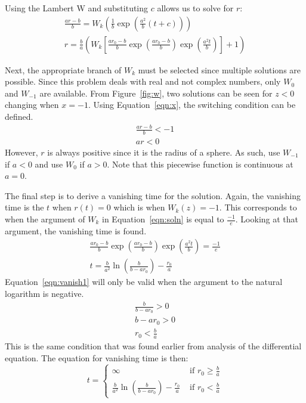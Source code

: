 \documentclass[journal]{IEEEtran}
\begin{document}
Using the Lambert W and substituting $c$ allows us to solve for $r$:
\begin{eqnarray}
  \frac{ar-b}{b} = W_k\left(\frac{1}{b}\exp\left(\frac{a^2}{b}(t+c)\right)\right) \\
  \label{eqn:soln}
  r = \frac{b}{a}\left(W_k\left[\frac{ar_0-b}{b} \exp\left(\frac{ar_0-b}{b}\right)\exp\left(\frac{a^2t}{b}\right)\right] + 1\right)
\end{eqnarray}

Next, the appropriate branch of $W_k$ must be selected since multiple solutions are possible.
Since this problem deals with real and not complex numbers, only $W_0$ and $W_{-1}$ are available.
From Figure~\ref{fig:w}, two solutions can be seen for $z < 0$ changing when $x = -1$.
Using Equation~\ref{eqn:x}, the switching condition can be defined.
\begin{eqnarray}
  \frac{ar-b}{b} < -1 \\
  ar < 0
\end{eqnarray}
However, $r$ is always positive since it is the radius of a sphere.
As such, use $W_{-1}$ if $a<0$ and use $W_0$ if $a>0$.
Note that this piecewise function is continuous at $a=0$.

The final step is to derive a vanishing time for the solution.
Again, the vanishing time is the $t$ when $r(t)=0$ which is when $W_k(z) = -1$.
This corresponds to when the argument of $W_k$ in Equation~\ref{eqn:soln} is equal to $\frac{-1}{e}$.
Looking at that argument, the vanishing time is found.
\begin{eqnarray}
  \frac{ar_0-b}{b} \exp\left(\frac{ar_0-b}{b}\right)\exp\left(\frac{a^2t}{b}\right) = \frac{-1}{e} \\
  \label{eqn:vanish1}
  t = \frac{b}{a^2} \ln\left(\frac{b}{b-ar_0}\right) - \frac{r_0}{a}
\end{eqnarray}
Equation~\ref{eqn:vanish1} will only be valid when the argument to the natural logarithm is negative.
\begin{eqnarray}
  \frac{b}{b-ar_0} > 0 \\
  b - ar_0 > 0 \\
  r_0 < \frac{b}{a}
\end{eqnarray}
This is the same condition that was found earlier from analysis of the differential equation.
The equation for vanishing time is then:
\begin{equation}
  \label{eqn:vanish}
  t = \left\{
    \begin{matrix}
      \infty & \text{ if } r_0 \geq \frac{b}{a} \\
      \frac{b}{a^2} \ln\left(\frac{b}{b-ar_0}\right) - \frac{r_0}{a} & \text{ if } r_0 < \frac{b}{a}
    \end{matrix}
  \right.
\end{equation}
\end{document}
